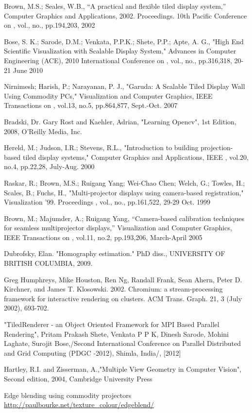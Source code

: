 \documentclass[letterpaper,10pt,conference]{/home/pranav/Desktop/Publication_work/latex_class_files/IEEEtran}
\begin{document}
\begin{thebibliography}{1}
Brown, M.S.; Seales, W.B., ``A practical and flexible tiled display system,'' Computer Graphics and Applications, 2002. Proceedings. 10th Pacific Conference on , vol., no., pp.194,203, 2002


Bose, S. K.; Sarode, D.M.; Venkata, P.P.K.; Shete, P.P.; Apte, A. G., "High End Scientific Visualization with Scalable Display System," Advances in Computer Engineering (ACE), 2010 International Conference on , vol., no., pp.316,318, 20-21 June 2010

Nirnimesh; Harish, P.; Narayanan, P. J., "Garuda: A Scalable Tiled Display Wall Using Commodity PCs," Visualization and Computer Graphics, IEEE Transactions on , vol.13, no.5, pp.864,877, Sept.-Oct. 2007

Bradski, Dr. Gary Rost and Kaehler, Adrian, "Learning Opencv", 1st Edition, 2008, O'Reilly Media, Inc.



Hereld, M.; Judson, I.R.; Stevens, R.L., "Introduction to building projection-based tiled display systems," Computer Graphics and Applications, IEEE , vol.20, no.4, pp.22,28, July-Aug. 2000

Raskar, R.; Brown, M.S.; Ruigang Yang; Wei-Chao Chen; Welch, G.; Towles, H.; Scales, B.; Fuchs, H., "Multi-projector displays using camera-based registration," Visualization '99. Proceedings , vol., no., pp.161,522, 29-29 Oct. 1999

Brown, M.; Majumder, A.; Ruigang Yang, ``Camera-based calibration techniques for seamless multiprojector displays,'' Visualization and Computer Graphics, IEEE Transactions on , vol.11, no.2, pp.193,206, March-April 2005


Dubrofsky, Elan. "Homography estimation." PhD diss., UNIVERSITY OF BRITISH COLUMBIA, 2009.

Greg Humphreys, Mike Houston, Ren Ng, Randall Frank, Sean Ahern, Peter D. Kirchner, and James T. Klosowski. 2002. Chromium: a stream-processing framework for interactive rendering on clusters. ACM Trans. Graph. 21, 3 (July 2002), 693-702. 

"TiledRenderer - an Object Oriented Framework for MPI Based Parallel 
Rendering", Pritam Prakash Shete, Venkata P P K, Dinesh Sarode, Mohini 
Laghate, Surojit Bose,/Second International Conference on Parallel 
Distributed and Grid Computing (PDGC -2012), Shimla, India/, [2012]

Hartley, R.I. and Zisserman, A.,"Multiple View Geometry in Computer Vision", Second edition, 2004, Cambridge University Press

Edge blending using commodity projectors\newline
\url{http://paulbourke.net/texture_colour/edgeblend/}

\end{thebibliography}
\end{document}
